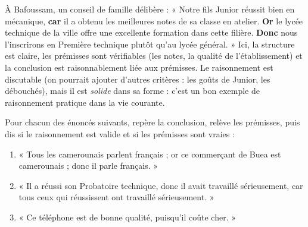 \documentclass[11pt]{article}
\begin{document}
\begin{exemplebox}
À Bafoussam, un conseil de famille délibère : « Notre fils Junior réussit bien en mécanique, \textbf{car} il a obtenu les meilleures notes de sa classe en atelier. \textbf{Or} le lycée technique de la ville offre une excellente formation dans cette filière. \textbf{Donc} nous l'inscrirons en Première technique plutôt qu'au lycée général. » Ici, la structure est claire, les prémisses sont vérifiables (les notes, la qualité de l'établissement) et la conclusion est raisonnablement liée aux prémisses. Le raisonnement est discutable (on pourrait ajouter d'autres critères : les goûts de Junior, les débouchés), mais il est \emph{solide} dans sa forme : c'est un bon exemple de raisonnement pratique dans la vie courante.
\end{exemplebox}

\begin{exercice}
Pour chacun des énoncés suivants, repère la conclusion, relève les prémisses, puis dis si le raisonnement est valide et si les prémisses sont vraies :
\begin{enumerate}
\item « Tous les camerounais parlent français ; or ce commerçant de Buea est camerounais ; donc il parle français. »
\item « Il a réussi son Probatoire technique, donc il avait travaillé sérieusement, car tous ceux qui réussissent ont travaillé sérieusement. »
\item « Ce téléphone est de bonne qualité, puisqu'il coûte cher. »
\end{enumerate}
\end{exercice}
\end{document}

